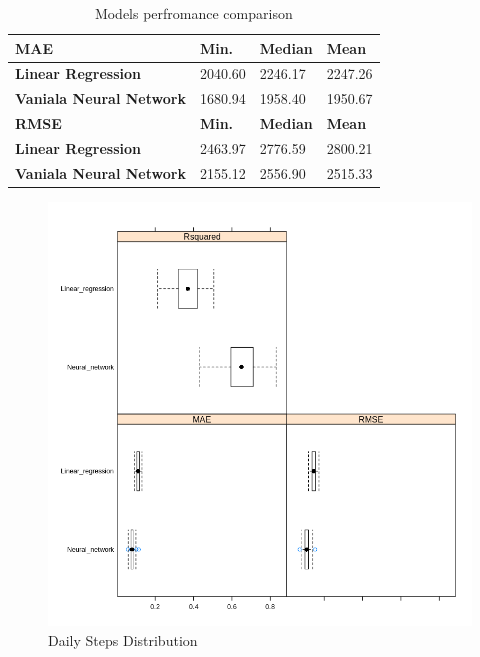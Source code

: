\documentclass[preprint,12pt]{elsarticle}
\begin{document}
\begin{table}[H]
\centering
\caption{Models perfromance comparison}
\begin{tabular}{l|l|l|l}
\textbf{MAE}                   & \textbf{Min.} & \textbf{Median} & \textbf{Mean} \\ \hline
\textbf{Linear Regression}     & 2040.60       & 2246.17         & 2247.26       \\ \cline{2-4} 
\textbf{Vaniala Neural Network} & 1680.94       & 1958.40         & 1950.67       \\ \hline
\textbf{RMSE}                  & \textbf{Min.} & \textbf{Median} & \textbf{Mean} \\ \hline
\textbf{Linear Regression}     & 2463.97       & 2776.59         & 2800.21       \\ \cline{2-4} 
\textbf{Vaniala Neural Network} & 2155.12       & 2556.90         & 2515.33      
\label{tab:Performance_linear_neuralnet}
\end{tabular}
\end{table}


\begin{figure}[H]
\centering
  \includegraphics[width=1.1\linewidth]{LR_NN_Comparision_04182019.png}
    \caption{Daily Steps Distribution}
  \label{fig:12}
\end{figure}
\end{document}
